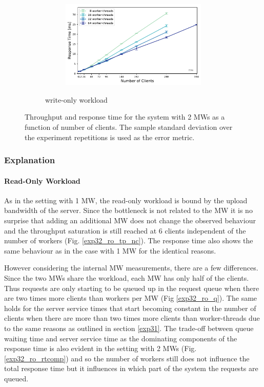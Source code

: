 \documentclass[report.tex]{subfiles}
\begin{document}
\begin{figure}[H]
\begin{subfigure}{\linewidth}
\begin{subfigure}[b]{.49\linewidth}
	\end{subfigure}\hfill
	\begin{subfigure}[b]{.49\linewidth}
		\centering
		\includegraphics[width=\linewidth]{data/exp32_wo_rt_nc_w.pdf}
	\end{subfigure}%
	\caption{write-only workload}\label{exp32_wo_tp_nc}
\end{subfigure}
\caption{Throughput and response time for the system with 2 MWs as a function of number of clients. The sample standard deviation over the experiment repetitions is used as the error metric.}
\end{figure}


\subsubsection{Explanation}

\paragraph{Read-Only Workload}

As in the setting with 1 MW, the read-only workload is bound by the upload bandwidth of the server. Since the bottleneck is not related to the MW it is no surprise that adding an additional MW does not change the observed behaviour and the throughput saturation is still reached at 6 clients independent of the number of workers (Fig. \ref{exp32_ro_tp_nc}). The response time also shows the same behaviour as in the case with 1 MW for the identical reasons.

However considering the internal MW measurements, there are a few differences.
Since the two MWs share the workload, each MW has only half of the clients.
Thus requests are only starting to be queued up in the request queue when there are two times more clients than workers per MW (Fig \ref{exp32_ro_q}).
The same holds for the server service times that start becoming constant in the number of clients when there are more than two times more clients than worker-threads due to the same reasons as outlined in section \ref{exp31}. 
The trade-off between queue waiting time and server service time as the dominating components of the response time is also evident in the setting with 2 MWs (Fig. \ref{exp32_ro_rtcomp}) and so the number of workers still does not influence the total response time but it influences in which part of the system the requests are queued.
\end{document}
